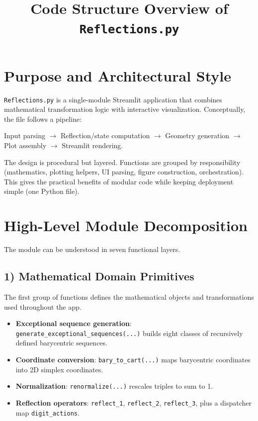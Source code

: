 \documentclass[11pt,a4paper]{article}
\title{Code Structure Overview of \texttt{Reflections.py}}
\author{}
\date{}
\begin{document}
\maketitle

\section*{Purpose and Architectural Style}
\texttt{Reflections.py} is a single-module Streamlit application that combines mathematical transformation logic with interactive visualization. Conceptually, the file follows a pipeline:

\begin{center}
Input parsing $\rightarrow$ Reflection/state computation $\rightarrow$ Geometry generation $\rightarrow$ Plot assembly $\rightarrow$ Streamlit rendering.
\end{center}

The design is procedural but layered. Functions are grouped by responsibility (mathematics, plotting helpers, UI parsing, figure construction, orchestration). This gives the practical benefits of modular code while keeping deployment simple (one Python file).

\section*{High-Level Module Decomposition}
The module can be understood in seven functional layers.

\subsection*{1) Mathematical Domain Primitives}
The first group of functions defines the mathematical objects and transformations used throughout the app.

\begin{itemize}
    \item \textbf{Exceptional sequence generation}: \texttt{generate\_exceptional\_sequences(...)} builds eight classes of recursively defined barycentric sequences.
    \item \textbf{Coordinate conversion}: \texttt{bary\_to\_cart(...)} maps barycentric coordinates into 2D simplex coordinates.
    \item \textbf{Normalization}: \texttt{renormalize(...)} rescales triples to sum to 1.
    \item \textbf{Reflection operators}: \texttt{reflect\_1}, \texttt{reflect\_2}, \texttt{reflect\_3}, plus a dispatcher map \texttt{digit\_actions}.
\end{itemize}
\end{document}
